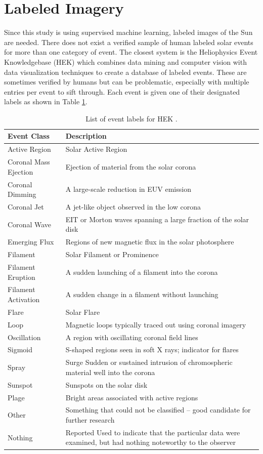 \documentclass[twoside]{report}
\begin{document}
\section{Labeled Imagery} \label{sec:labeling}
Since this study is using supervised machine learning, labeled images of the Sun are needed. There does not exist a verified sample of human labeled solar events for more than one category of event. The closest system is the Heliophysics Event Knowledgebase (HEK) \cite{hurlburt:2012} which combines data mining and computer vision with data visualization techniques to create a database of labeled events. These are sometimes verified by humans but can be problematic, especially with multiple entries per event to sift through. Each event is given one of their designated labels as shown in Table \ref{tab:heklabels}.  

\begin{table}[ht!]
  \centering
  \begin{tabular}{|p{4cm} p{10cm}|}
    \hline
    Event Class & Description \\ \hline
    Active Region & Solar Active Region\\
    Coronal Mass Ejection & Ejection of material from the solar corona \\
    Coronal Dimming & A large-scale reduction in EUV emission \\
    Coronal Jet & A jet-like object observed in the low corona \\
    Coronal Wave & EIT or Morton waves spanning a large fraction of the solar disk \\
    Emerging Flux & Regions of new magnetic flux in the solar photosphere \\
    Filament & Solar Filament or Prominence \\
    Filament Eruption & A sudden launching of a filament into the corona  \\
    Filament Activation & A sudden change in a filament without launching \\
    Flare & Solar Flare \\
    Loop & Magnetic loops typically traced out using coronal imagery \\
    Oscillation &  A region with oscillating coronal field lines \\
    Sigmoid & S-shaped regions seen in soft X rays; indicator for flares \\
    Spray & Surge Sudden or sustained intrusion of chromospheric material well into the corona \\
    Sunspot & Sunspots on the solar disk \\
    Plage &  Bright areas associated with active regions\\
    Other & Something that could not be classified – good candidate for further research \\
    Nothing & Reported Used to indicate that the particular data were examined, but had nothing noteworthy to the observer \\
    \hline             
  \end{tabular}
  \caption{List of event labels for HEK \cite{hurlburt:2012}.}
  \label{tab:heklabels}
\end{table}
\end{document}

